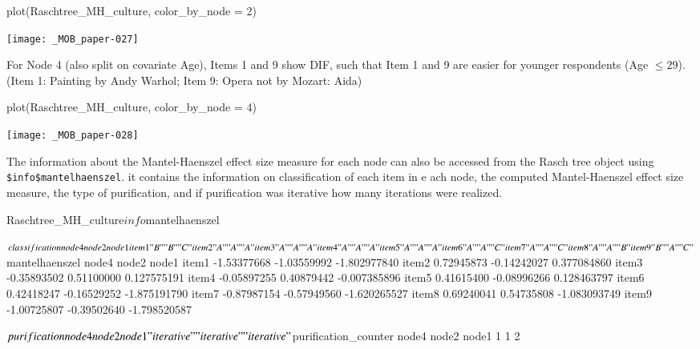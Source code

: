 \documentclass[doc,floatsintext,natbib]{apa7}
\begin{document}
\begin{Schunk}
\begin{Sinput}
 plot(Raschtree_MH_culture, color_by_node = 2)
\end{Sinput}
\end{Schunk}
\texttt{[image: \_MOB\_paper-027]}

For Node 4 (also split on covariate Age), Items 1 and 9 show DIF, such that Item 1 and 9 are easier for younger respondents (Age $\leq 29$). (Item 1: Painting by Andy Warhol; Item 9: Opera not by Mozart: Aida)

\begin{Schunk}
\begin{Sinput}
 plot(Raschtree_MH_culture, color_by_node = 4)
\end{Sinput}
\end{Schunk}
\texttt{[image: \_MOB\_paper-028]}




The information about the Mantel-Haenszel effect size measure for each node can also be accessed from the Rasch tree object using \texttt{\$info\$mantelhaenszel}. it contains the information on classification of each item in e ach node, the computed Mantel-Haenszel effect size measure, the type of purification, and if purification was iterative how many iterations were realized. 

\begin{Schunk}
\begin{Sinput}
 Raschtree_MH_culture$info$mantelhaenszel
\end{Sinput}
\begin{Soutput}
$classification
      node4 node2 node1
item1 "B"   "B"   "C"  
item2 "A"   "A"   "A"  
item3 "A"   "A"   "A"  
item4 "A"   "A"   "A"  
item5 "A"   "A"   "A"  
item6 "A"   "A"   "C"  
item7 "A"   "A"   "C"  
item8 "A"   "A"   "B"  
item9 "B"   "A"   "C"  

$mantelhaenszel
            node4       node2        node1
item1 -1.53377668 -1.03559992 -1.802977840
item2  0.72945873 -0.14242027  0.377084860
item3 -0.35893502  0.51100000  0.127575191
item4 -0.05897255  0.40879442 -0.007385896
item5  0.41615400 -0.08996266  0.128463797
item6  0.42418247 -0.16529252 -1.875191790
item7 -0.87987154 -0.57949560 -1.620265527
item8  0.69240041  0.54735808 -1.083093749
item9 -1.00725807 -0.39502640 -1.798520587

$purification
      node4       node2       node1 
"iterative" "iterative" "iterative" 

$purification_counter
node4 node2 node1 
    1     1     2 
\end{Soutput}
\end{Schunk}
\end{document}
